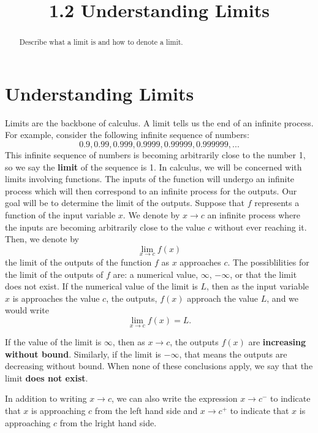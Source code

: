 \documentclass[handout]{ximera}
\title{1.2 Understanding Limits}
\begin{document}
\begin{abstract}
Describe what a limit is and how to denote a limit.
\end{abstract}

\maketitle

\section{Understanding Limits}
 


Limits are the backbone of calculus. A limit tells us the end of an infinite process. For example, consider the following infinite sequence of numbers:
\[ 0.9, 0.99, 0.999, 0.9999, 0.99999, 0.999999, ... \]
This infinite sequence of numbers is becoming arbitrarily close to the number 1, so we say the \textbf{limit} of the sequence is 1.
In calculus, we will be concerned with limits involving functions.
The inputs of the function will undergo an infinite process which will then correspond to an infinite process for the outputs.  Our goal will be to determine the limit of the outputs.
Suppose that $f$ represents a function of the input variable $x$.
We denote by $x \to c$ an infinite process where the inputs are becoming arbitrarily close to the value $c$ without ever reaching it.
Then, we denote by
\[ \lim_{x\to c} f(x) \]
the limit of the outputs of the function $f$ as $x$ approaches $c$.
The possiblilities for the limit of the outputs of $f$ are: a numerical value, 
$\infty$, $-\infty$, or that the limit does not exist.
If the numerical value of the limit is $L$, then as the input variable $x$ is approaches the value $c$, the outputs, $f(x)$ approach the value $L$, and we would write
\[ 
\lim_{x\to c} f(x) = L.
\]

If the value of the limit is $\infty$, then as $x \to c$, the outputs $f(x)$ are \textbf{increasing without bound}.  
Similarly, if the limit is $-\infty$, that means the outputs are decreasing without bound.
When none of these conclusions apply, we say that the limit \textbf{does not exist}. 

In addition to writing $x \to c$, we can also write the expression
$x \to c^-$ to indicate that $x$ is approaching $c$ from the left hand side and $x \to c^+$ to 
indicate that $x$ is approaching $c$ from the lright hand side.
\end{document}
